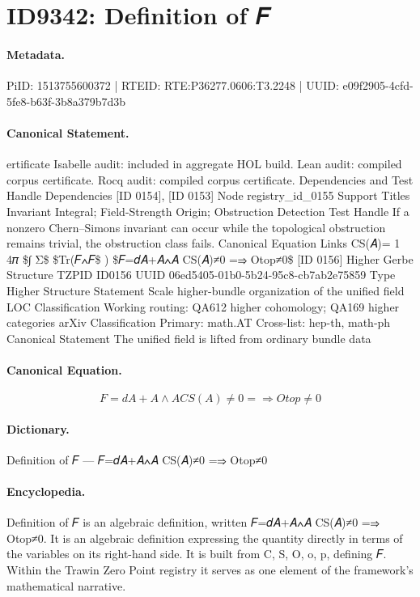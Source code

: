\section*{ID9342: Definition of 𝐹}
\paragraph{Metadata.}
PiID: 1513755600372 | RTEID: RTE:P36277.0606:T3.2248 | UUID: e09f2905-4cfd-5fe8-b63f-3b8a379b7d3b

\paragraph{Canonical Statement.}
ertificate Isabelle audit: included in aggregate HOL build. Lean audit: compiled corpus certificate. Rocq audit: compiled corpus certificate. Dependencies and Test Handle Dependencies [ID 0154], [ID 0153] Node registry\_id\_0155 Support Titles Invariant Integral; Field-Strength Origin; Obstruction Detection Test Handle If a nonzero Chern–Simons invariant can occur while the topological obstruction remains trivial, the obstruction class fails. Canonical Equation Links CS(𝐴)= 1 4𝜋 \$∫ Σ\$ \$Tr(𝐹∧𝐹\$ ) \$𝐹=𝑑𝐴+𝐴∧𝐴 CS(𝐴)≠0 =⇒ Otop≠0\$ [ID 0156] Higher Gerbe Structure TZPID ID0156 UUID 06ed5405-01b0-5b24-95c8-cb7ab2e75859 Type Higher Structure Statement Scale higher-bundle organization of the unified field LOC Classification Working routing: QA612 higher cohomology; QA169 higher categories arXiv Classification Primary: math.AT Cross-list: hep-th, math-ph Canonical Statement The unified field is lifted from ordinary bundle data

\paragraph{Canonical Equation.}
\[
𝐹=𝑑𝐴+𝐴∧𝐴 CS(𝐴)≠0 =⇒ Otop≠0
\]

\paragraph{Dictionary.}
Definition of 𝐹 — 𝐹=𝑑𝐴+𝐴∧𝐴 CS(𝐴)≠0 =⇒ Otop≠0

\paragraph{Encyclopedia.}
Definition of 𝐹 is an algebraic definition, written 𝐹=𝑑𝐴+𝐴∧𝐴 CS(𝐴)≠0 =⇒ Otop≠0. It is an algebraic definition expressing the quantity directly in terms of the variables on its right-hand side. It is built from C, S, O, o, p, defining 𝐹. Within the Trawin Zero Point registry it serves as one element of the framework's mathematical narrative.

